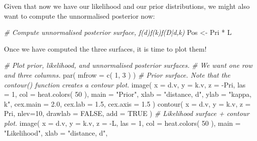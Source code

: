 \documentclass[
]{article}
\newenvironment{Shaded}{\begin{snugshade}}{\end{snugshade}}
\newcommand{\AttributeTok}[1]{\textcolor[rgb]{0.77,0.63,0.00}{#1}}
\newcommand{\CommentTok}[1]{\textcolor[rgb]{0.56,0.35,0.01}{\textit{#1}}}
\newcommand{\ConstantTok}[1]{\textcolor[rgb]{0.00,0.00,0.00}{#1}}
\newcommand{\DecValTok}[1]{\textcolor[rgb]{0.00,0.00,0.81}{#1}}
\newcommand{\FloatTok}[1]{\textcolor[rgb]{0.00,0.00,0.81}{#1}}
\newcommand{\FunctionTok}[1]{\textcolor[rgb]{0.00,0.00,0.00}{#1}}
\newcommand{\NormalTok}[1]{#1}
\newcommand{\OtherTok}[1]{\textcolor[rgb]{0.56,0.35,0.01}{#1}}
\newcommand{\SpecialCharTok}[1]{\textcolor[rgb]{0.00,0.00,0.00}{#1}}
\newcommand{\StringTok}[1]{\textcolor[rgb]{0.31,0.60,0.02}{#1}}
\begin{document}
Given that now we have our likelihood and our prior distributions, we
might also want to compute the unnormalised posterior now:

\begin{Shaded}
\begin{Highlighting}[]
\CommentTok{\# Compute unnormalised posterior surface, f(d)f(k)f(D|d,k)}
\NormalTok{Pos }\OtherTok{\textless{}{-}}\NormalTok{ Pri }\SpecialCharTok{*}\NormalTok{ L}
\end{Highlighting}
\end{Shaded}

Once we have computed the three surfaces, it is time to plot them!

\begin{Shaded}
\begin{Highlighting}[]
\CommentTok{\# Plot prior, likelihood, and unnormalised posterior surfaces.}
\CommentTok{\# We want one row and three columns.}
\FunctionTok{par}\NormalTok{( }\AttributeTok{mfrow =} \FunctionTok{c}\NormalTok{( }\DecValTok{1}\NormalTok{, }\DecValTok{3}\NormalTok{ ) )}
\CommentTok{\# Prior surface. Note that the \textasciigrave{}contour()\textasciigrave{} function creates a contour plot.}
\FunctionTok{image}\NormalTok{( }\AttributeTok{x =}\NormalTok{ d.v, }\AttributeTok{y =}\NormalTok{ k.v, }\AttributeTok{z =} \SpecialCharTok{{-}}\NormalTok{Pri, }\AttributeTok{las =} \DecValTok{1}\NormalTok{, }\AttributeTok{col =} \FunctionTok{heat.colors}\NormalTok{( }\DecValTok{50}\NormalTok{ ),}
       \AttributeTok{main =} \StringTok{"Prior"}\NormalTok{, }\AttributeTok{xlab =} \StringTok{"distance, d"}\NormalTok{,}
       \AttributeTok{ylab =} \StringTok{"kappa, k"}\NormalTok{, }\AttributeTok{cex.main =} \FloatTok{2.0}\NormalTok{,}
       \AttributeTok{cex.lab =} \FloatTok{1.5}\NormalTok{, }\AttributeTok{cex.axis =} \FloatTok{1.5}\NormalTok{ )}
\FunctionTok{contour}\NormalTok{( }\AttributeTok{x =}\NormalTok{ d.v, }\AttributeTok{y =}\NormalTok{ k.v, }\AttributeTok{z =}\NormalTok{ Pri, }\AttributeTok{nlev=}\DecValTok{10}\NormalTok{, }\AttributeTok{drawlab =} \ConstantTok{FALSE}\NormalTok{, }\AttributeTok{add =} \ConstantTok{TRUE}\NormalTok{ )}
\CommentTok{\# Likelihood surface + contour plot.}
\FunctionTok{image}\NormalTok{( }\AttributeTok{x =}\NormalTok{ d.v, }\AttributeTok{y =}\NormalTok{ k.v, }\AttributeTok{z =} \SpecialCharTok{{-}}\NormalTok{L, }\AttributeTok{las =} \DecValTok{1}\NormalTok{, }\AttributeTok{col =} \FunctionTok{heat.colors}\NormalTok{( }\DecValTok{50}\NormalTok{ ),}
       \AttributeTok{main =} \StringTok{"Likelihood"}\NormalTok{, }\AttributeTok{xlab =} \StringTok{"distance, d"}\NormalTok{,}

\end{Highlighting}
\end{Shaded}
\end{document}
